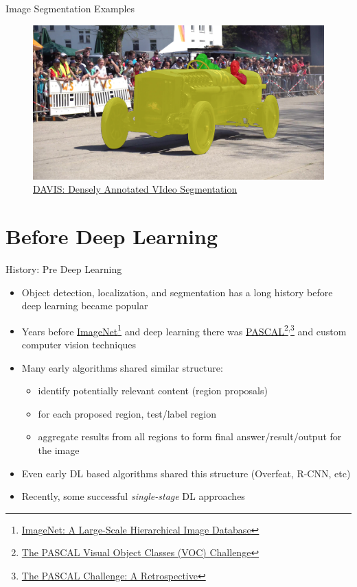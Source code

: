 \documentclass[handout]{beamer}
\begin{document}
\begin{frame}{Image Segmentation Examples}
\begin{figure}
\includegraphics[width=\textwidth]{../media/davis_1.png}
\caption{\href{http://davischallenge.org/index.html}{\color{blue}DAVIS: Densely Annotated VIdeo Segmentation}}
\end{figure}
\end{frame}

\section{Before Deep Learning}  

\begin{frame}{History: Pre Deep Learning}
\begin{itemize}
  \item<1-> Object detection, localization, and segmentation has a long history before deep learning became popular
  \item<2-> Years before \href{http://www.image-net.org}{\color{blue}ImageNet}\footnote{\href{http://www.image-net.org/papers/imagenet_cvpr09.pdf}{\color{blue}ImageNet: A Large-Scale Hierarchical Image Database}} and deep learning there was \href{http://host.robots.ox.ac.uk/pascal/VOC/}{\color{blue}PASCAL}\footnote{\href{http://host.robots.ox.ac.uk/pascal/VOC/pubs/everingham10.html\#abstract}{\color{blue}The PASCAL Visual Object Classes (VOC) Challenge}}\textsuperscript{,}\footnote{\href{http://host.robots.ox.ac.uk/pascal/VOC/pubs/everingham15.html\#abstract}{\color{blue}The PASCAL Challenge: A Retrospective}} and custom computer vision techniques
  \item<3-> Many early algorithms shared similar structure:
  \begin{itemize}
  	\item<1->identify potentially relevant content (region proposals)
	\item<2->for each proposed region, test/label region 
	\item<3->aggregate results from all regions to form final answer/result/output for the image
  \end{itemize}
  \item<4->Even early DL based algorithms shared this structure (Overfeat, R-CNN, etc)
  \item<5->Recently, some successful \emph{single-stage} DL approaches 
\end{itemize}
\end{frame}
\end{document}
